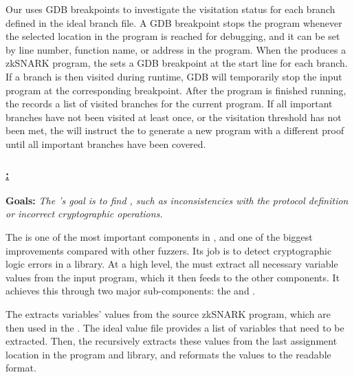 %
Our \branchmodel uses GDB breakpoints to investigate the visitation status for each branch defined in the ideal branch file. A GDB breakpoint stops the program whenever the selected location in the program is reached for debugging, and it can be set by line number, function name, or address in the program.  When the  produces a zkSNARK program, the \branchmodel sets a GDB breakpoint at the start line for each branch. If a branch is then visited during runtime, GDB will temporarily stop the input program at the corresponding breakpoint. After the program is finished running, the \branchmodel records a list of visited branches for the current program. If all important branches have not been visited at least once, or the visitation threshold has not been met, the \branchmodel will instruct the  to generate a new program with a different proof until all important branches have been covered.




\subsubsection*{\underline{\SnarkFuzzer: }}
\label{subsec:snarkprobe-value-model}

\textbf{Goals: } \emph{The 's goal is to find , such as inconsistencies with the protocol definition or incorrect cryptographic operations.}

%
The  is one of the most important components in \SnarkFuzzer, and one of the biggest improvements compared with other fuzzers. Its job is to detect cryptographic logic errors in a library.  At a high level, the  must extract all necessary variable values from the input program, which it then feeds to the other components.
It achieves this through two major sub-components: the  and .

The  extracts variables' values from the source zkSNARK program, which are then used in the .  The ideal value file provides a list of variables that need to be extracted. Then, the  recursively extracts these values from the last assignment location in the program and library, and reformats the values to the  readable format.

